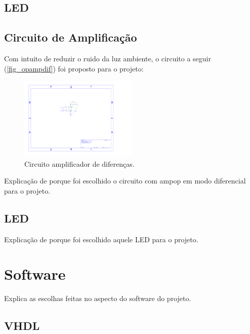 	\lipsum[15]
	
	\subsection{LED}
	
	\lipsum[2]
	
	
	\subsection{Circuito de Amplificação}
	
	Com intuito de reduzir o ruido da luz ambiente, o circuito a seguir (\autoref{fig_opampdif}) foi proposto para o projeto:
	
	\begin{figure}[htb]
		\caption{\label{fig_opampdif}Circuito amplificador de diferenças.}
		\begin{center}
			\includegraphics[width=0.5\textwidth, trim={9.5cm 11.2cm 15cm 5.76cm},clip]{opamp-dif.pdf}
		\end{center}
	\end{figure}
	
	Explicação de porque foi escolhido o circuito com ampop em modo diferencial para o projeto.
	
	\subsection{LED}
	
	Explicação de porque foi escolhido aquele LED para o projeto.
	
	\section{Software}\label{sec-software}
	
	Explica as escolhas feitas no aspecto do software do projeto.
	
	\subsection{VHDL}
	
